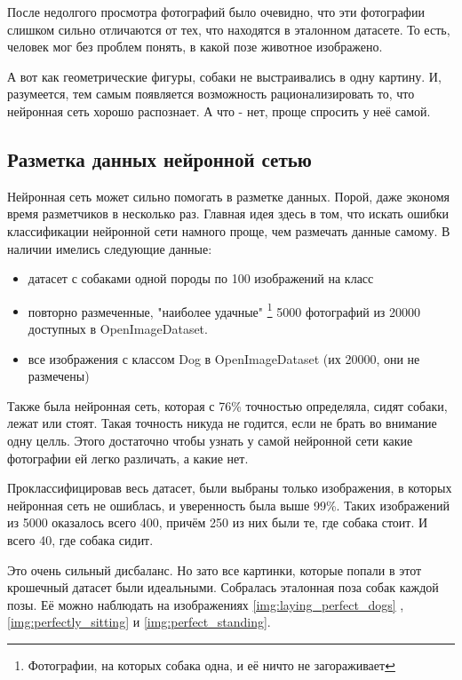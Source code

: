После недолгого просмотра фотографий было очевидно, что эти фотографии слишком сильно отличаются от тех, что находятся в эталонном датасете. То есть, человек мог без проблем понять, в какой позе животное изображено.

А вот как геометрические фигуры, собаки не выстраивались в одну картину. И, разумеется, тем самым появляется возможность рационализировать то, что нейронная сеть хорошо распознает. А что - нет, проще спросить у неё самой.

\subsection{Разметка данных нейронной сетью}
Нейронная сеть может сильно помогать в разметке данных. Порой, даже экономя время разметчиков в несколько раз. Главная идея здесь в том, что искать ошибки классификации нейронной сети намного проще, чем размечать данные самому. 
В наличии имелись следующие данные:
\begin{itemize}
    \item датасет с собаками одной породы по 100 изображений на класс
    \item повторно размеченные, "наиболее удачные"
    \footnote{Фотографии, на которых собака одна, и её ничто не загораживает} 
    5000 фотографий из 20000 доступных в OpenImageDataset.
    \item все изображения с классом Dog в OpenImageDataset (их 20000, они не размечены)
\end{itemize}


Также была нейронная сеть, которая с 76\% точностью определяла, сидят собаки, лежат или стоят. Такая точность никуда не годится, если не брать во внимание одну целль. Этого достаточно чтобы узнать у самой нейронной сети какие фотографии ей легко различать, а какие нет.

Проклассифицировав весь датасет, были выбраны только изображения, в которых нейронная сеть не ошиблась, и уверенность была выше 99\%. Таких изображений из 5000 оказалось всего 400, причём 250 из них были те, где собака стоит. И всего 40, где собака сидит. 

Это очень сильный дисбаланс. Но зато все картинки, которые попали в этот крошечный датасет были идеальными. Собралась эталонная поза собак каждой позы. Её можно наблюдать на изображениях \ref{img:laying_perfect_dogs} , \ref{img:perfectly_sitting}  и \ref{img:perfect_standing}.


